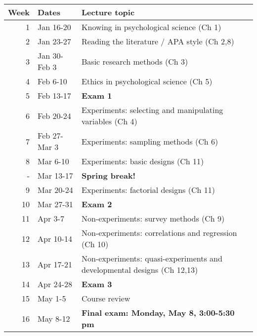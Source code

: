 \documentclass[10pt]{article}
\begin{document}
\begin{center}
\begin{tabular}{rll}
Week & Dates & Lecture topic\\
\hline
1 & Jan 16-20 & Knowing in psychological science (Ch 1)\\
2 & Jan 23-27 & Reading the literature / APA style (Ch 2,8)\\
3 & Jan 30-Feb 3 & Basic research methods (Ch 3)\\
4 & Feb 6-10 & Ethics in psychological science (Ch 5)\\
5 & Feb 13-17 & \textbf{Exam 1}\\
6 & Feb 20-24 & Experiments: selecting and manipulating variables (Ch 4)\\
7 & Feb 27-Mar 3 & Experiments: sampling methods (Ch 6)\\
8 & Mar 6-10 & Experiments: basic designs (Ch 11)\\
- & Mar 13-17 & \textbf{Spring break!}\\
9 & Mar 20-24 & Experiments: factorial designs (Ch 11)\\
10 & Mar 27-31 & \textbf{Exam 2}\\
11 & Apr 3-7 & Non-experiments: survey methods (Ch 9)\\
12 & Apr 10-14 & Non-experiments: correlations and regression (Ch 10)\\
13 & Apr 17-21 & Non-experiments: quasi-experiments and developmental designs (Ch 12,13)\\
14 & Apr 24-28 & \textbf{Exam 3}\\
15 & May 1-5 & Course review\\
16 & May 8-12 & \textbf{Final exam: Monday, May 8, 3:00-5:30 pm}\\
\end{tabular}
\end{center}
\end{document}

